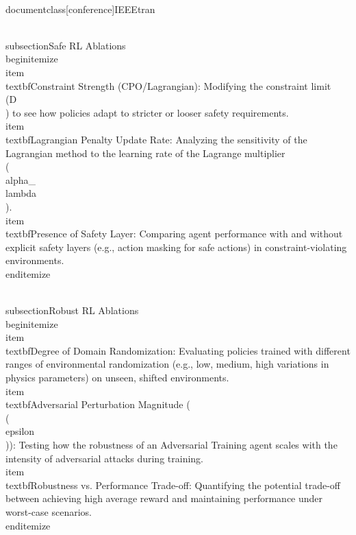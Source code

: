 \\documentclass[conference]{IEEEtran}
\begin{document}
\\subsection{Safe RL Ablations}
\\begin{itemize}
    \\item \\textbf{Constraint Strength (CPO/Lagrangian):} Modifying the constraint limit \\(D\\) to see how policies adapt to stricter or looser safety requirements.
    \\item \\textbf{Lagrangian Penalty Update Rate:} Analyzing the sensitivity of the Lagrangian method to the learning rate of the Lagrange multiplier \\(\\alpha_{\\lambda}\\).
    \\item \\textbf{Presence of Safety Layer:} Comparing agent performance with and without explicit safety layers (e.g., action masking for safe actions) in constraint-violating environments.
\\end{itemize}

\\subsection{Robust RL Ablations}
\\begin{itemize}
    \\item \\textbf{Degree of Domain Randomization:} Evaluating policies trained with different ranges of environmental randomization (e.g., low, medium, high variations in physics parameters) on unseen, shifted environments.
    \\item \\textbf{Adversarial Perturbation Magnitude (\\(\\epsilon\\)):} Testing how the robustness of an Adversarial Training agent scales with the intensity of adversarial attacks during training.
    \\item \\textbf{Robustness vs. Performance Trade-off:} Quantifying the potential trade-off between achieving high average reward and maintaining performance under worst-case scenarios.
\\end{itemize}
\end{document}
